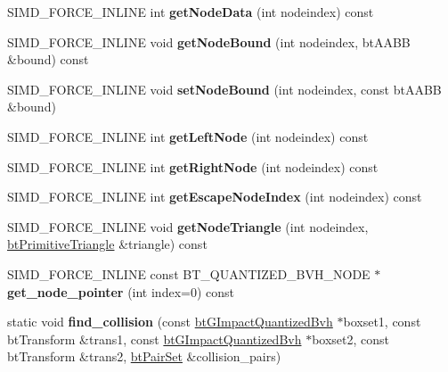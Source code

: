 \begin{DoxyCompactItemize}
\mbox{\label{classbtGImpactQuantizedBvh_a12132949eefa86c915a05fe096971bb7}} 
S\+I\+M\+D\+\_\+\+F\+O\+R\+C\+E\+\_\+\+I\+N\+L\+I\+NE int {\bfseries get\+Node\+Data} (int nodeindex) const
\item 
\mbox{\label{classbtGImpactQuantizedBvh_af2580802ef1615c666dc16591bde980e}} 
S\+I\+M\+D\+\_\+\+F\+O\+R\+C\+E\+\_\+\+I\+N\+L\+I\+NE void {\bfseries get\+Node\+Bound} (int nodeindex, bt\+A\+A\+BB \&bound) const
\item 
\mbox{\label{classbtGImpactQuantizedBvh_ad5ce839e5417a84899a177197dac9bca}} 
S\+I\+M\+D\+\_\+\+F\+O\+R\+C\+E\+\_\+\+I\+N\+L\+I\+NE void {\bfseries set\+Node\+Bound} (int nodeindex, const bt\+A\+A\+BB \&bound)
\item 
\mbox{\label{classbtGImpactQuantizedBvh_ac23d86ca78e016ea10d998c0a86c9202}} 
S\+I\+M\+D\+\_\+\+F\+O\+R\+C\+E\+\_\+\+I\+N\+L\+I\+NE int {\bfseries get\+Left\+Node} (int nodeindex) const
\item 
\mbox{\label{classbtGImpactQuantizedBvh_a49400a16e5652be1e69009733ad9acc3}} 
S\+I\+M\+D\+\_\+\+F\+O\+R\+C\+E\+\_\+\+I\+N\+L\+I\+NE int {\bfseries get\+Right\+Node} (int nodeindex) const
\item 
\mbox{\label{classbtGImpactQuantizedBvh_ade06323022f1de1d12f19de1f1ef190d}} 
S\+I\+M\+D\+\_\+\+F\+O\+R\+C\+E\+\_\+\+I\+N\+L\+I\+NE int {\bfseries get\+Escape\+Node\+Index} (int nodeindex) const
\item 
\mbox{\label{classbtGImpactQuantizedBvh_a0b01e04d70aeec6ce570958c8fb2ce68}} 
S\+I\+M\+D\+\_\+\+F\+O\+R\+C\+E\+\_\+\+I\+N\+L\+I\+NE void {\bfseries get\+Node\+Triangle} (int nodeindex, \hyperlink{classbtPrimitiveTriangle}{bt\+Primitive\+Triangle} \&triangle) const
\item 
\mbox{\label{classbtGImpactQuantizedBvh_a8e21bbe54a9fd1482ce3bd7f88162dda}} 
S\+I\+M\+D\+\_\+\+F\+O\+R\+C\+E\+\_\+\+I\+N\+L\+I\+NE const B\+T\+\_\+\+Q\+U\+A\+N\+T\+I\+Z\+E\+D\+\_\+\+B\+V\+H\+\_\+\+N\+O\+DE $\ast$ {\bfseries get\+\_\+node\+\_\+pointer} (int index=0) const
\item 
\mbox{\label{classbtGImpactQuantizedBvh_a633dd47fdeed1c7fe4e8a509df516d27}} 
static void {\bfseries find\+\_\+collision} (const \hyperlink{classbtGImpactQuantizedBvh}{bt\+G\+Impact\+Quantized\+Bvh} $\ast$boxset1, const bt\+Transform \&trans1, const \hyperlink{classbtGImpactQuantizedBvh}{bt\+G\+Impact\+Quantized\+Bvh} $\ast$boxset2, const bt\+Transform \&trans2, \hyperlink{classbtPairSet}{bt\+Pair\+Set} \&collision\+\_\+pairs)
\end{DoxyCompactItemize}


